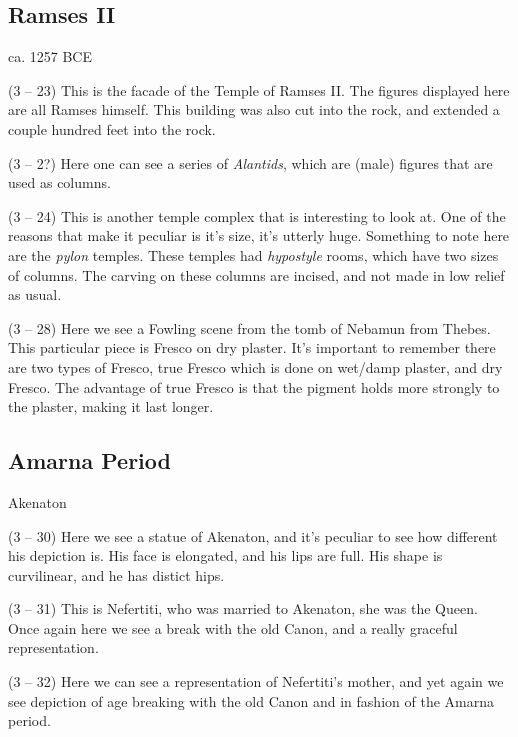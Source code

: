 \documentclass{article}
\begin{document}
    \begin{spacing}{1.2}
    \newpage
    \subsection{Ramses II}
    \begin{flushright}
        ca. 1257 BCE
    \end{flushright}

    (3 -- 23) This is the facade of the Temple of Ramses II. The figures 
    displayed here are all Ramses himself. This building was also cut into the rock, and extended a couple hundred feet into the rock.

    (3 -- 2?) Here one can see a series of \emph{Alantids}, which are (male) figures that are used as columns.

    (3 -- 24) This is another temple complex that is interesting to look at. One of the reasons that make it peculiar is it's size, it's utterly huge. Something to note here are the \emph{pylon} temples. These temples had \emph{hypostyle} rooms, which have two sizes of columns. The carving on these columns are incised, and not made in low relief as usual.

    (3 -- 28) Here we see a Fowling scene from the tomb of Nebamun from Thebes. This particular piece is Fresco on dry plaster. It's important to remember there are two types of Fresco, true Fresco which is done on wet/damp plaster, and dry Fresco. The advantage of true Fresco is that the pigment holds more strongly to the plaster, making it last longer.

    \subsection{Amarna Period}
    \begin{flushright}
        Akenaton 
    \end{flushright}
    (3 -- 30) Here we see a statue of Akenaton, and it's peculiar to see how different his depiction is. His face is elongated, and his lips are full. His shape is curvilinear, and he has distict hips. 

    (3 -- 31) This is Nefertiti, who was married to Akenaton, she was the Queen. Once again here we see a break with the old Canon, and a really graceful representation.

    (3 -- 32) Here we can see a representation of Nefertiti's mother, and yet again we see depiction of age breaking with the old Canon and in fashion of the Amarna period.


\end{spacing}
\end{document}
